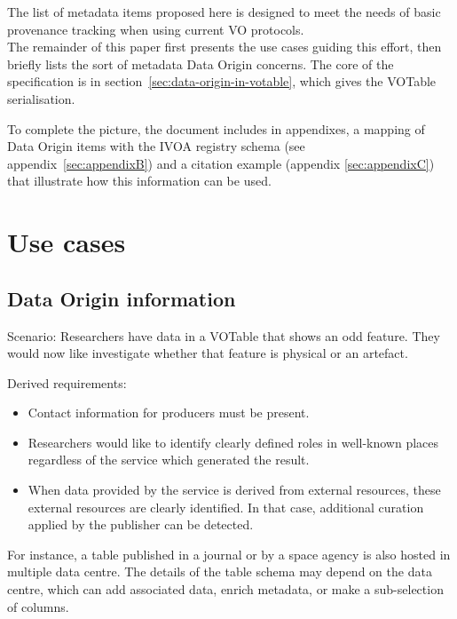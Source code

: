 \documentclass[11pt,a4paper]{ivoa}
\begin{document}
The list of metadata items proposed here is designed to meet the needs of basic provenance
tracking when using current VO protocols.\\


The remainder of this paper first presents the use cases guiding this
effort, then briefly lists the sort of metadata Data Origin concerns.
The core of the specification is in
section~\ref{sec:data-origin-in-votable}, which
gives the VOTable serialisation.

To complete the picture, the document includes in appendixes, a mapping of Data Origin items with the IVOA registry schema (see appendix~\ref{sec:appendixB})
and a citation example (appendix \ref{sec:appendixC}) that illustrate how this information can be used.



\section{Use cases}

\subsection{Data Origin information} 

Scenario: Researchers have data in a VOTable that shows an odd feature. They would now like investigate whether that feature is physical or an artefact.

Derived requirements:

\begin{itemize}
\item Contact information for producers must be present.
	
\item Researchers would like to identify clearly defined roles in well-known places regardless of the service which generated the result.
		
\item When data provided by the service is derived from external resources, these external resources are clearly identified.  In that case, additional curation applied by the publisher can be detected.
\end{itemize}

For instance, a table published in a journal or by a space agency is also hosted in multiple data centre. The details of the table schema may depend on the data centre, which can add associated data, enrich metadata, or make a sub-selection of columns.
\end{document}
